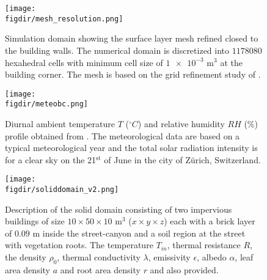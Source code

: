 \begin{figure}[p]
	\centering
	\texttt{[image: \\figdir/mesh\_resolution.png]}
	\caption{Simulation domain showing the surface layer mesh refined closed to the building walls. The numerical domain is discretized into $\num{1178080}$ hexahedral cells with minimum cell size of $\num{1e-3}$ m$^{3}$ at the building corner. The mesh is based on the grid refinement study of \cite{Kubilay2018}.}
	\label{fig:mesh_resolution}
\end{figure}

\begin{figure}[p]
	\centering
	\texttt{[image: \\figdir/meteobc.png]}
	\caption{Diurnal ambient temperature $T$ ($^{\circ}C$) and relative humidity $RH$ (\%) profile obtained from \cite{Kubilay2018}. The meteorological data are based on a typical meteorological year and the total solar radiation intensity is for a clear sky on the 21$^{\mathrm{st}}$ of June in the city of Z\"urich, Switzerland. }
	\label{fig:meteobc}
\end{figure}

\begin{figure}[p]
	\centering
	\texttt{[image: \\figdir/soliddomain\_v2.png]}
	\caption{Description of the solid domain consisting of two impervious buildings of size $10 \times 50 \times 10$ m$^3$ ($x\times y \times z$) each with a brick layer of $0.09$ m inside the street-canyon and a soil region at the street with vegetation roots. The temperature $T_{\textit{in}}$, thermal resistance $R$, the density $\rho_0$, thermal conductivity $\lambda$, emissivity $\epsilon$, albedo $\alpha$, leaf area density $a$ and root area density $r$ and also provided. }
	\label{fig:soliddomain}
\end{figure}


